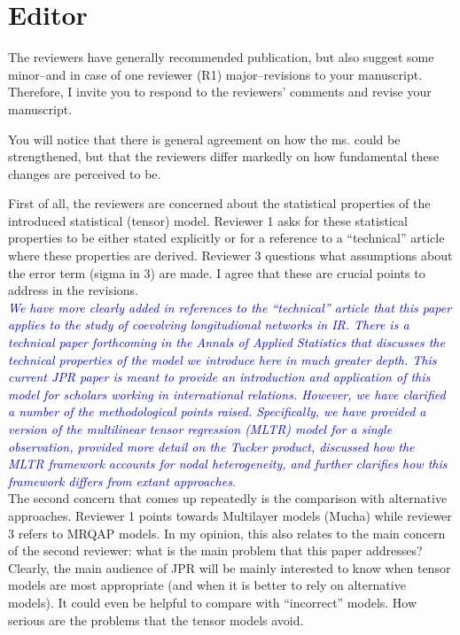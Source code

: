 \section{Editor}

The reviewers have generally recommended publication, but also suggest some minor--and in case of one reviewer (R1) major--revisions to your manuscript. Therefore, I invite you to respond to the reviewers' comments and revise your manuscript.

You will notice that there is general agreement on how the ms. could be strengthened, but that the reviewers differ markedly on how fundamental these changes are perceived to be.

First of all, the reviewers are concerned about the statistical properties of the introduced statistical (tensor) model. Reviewer 1 asks for these statistical properties to be either stated explicitly or for a reference to a ``technical'' article where these properties are derived. Reviewer 3 questions what assumptions about the error term (sigma in 3) are made. I agree that these are crucial points to address in the revisions. \\

\textcolor{blue}{\emph{
	We have more clearly added in references to the ``technical'' article that this paper applies to the study of coevolving longitudional networks in IR. There is a technical paper forthcoming in the Annals of Applied Statistics that discusses the technical properties of the model we introduce here in much greater depth. This current JPR paper is meant to provide an introduction and application of this model for scholars working in international relations. However, we have clarified a number of the methodological points raised. Specifically, we have provided a version of the multilinear tensor regression (MLTR) model for a single observation, provided more detail on the Tucker product, discussed how the MLTR framework accounts for nodal heterogeneity, and further clarifies how this framework differs from extant approaches.
}} \\

The second concern that comes up repeatedly is the comparison with alternative approaches. Reviewer 1 points towards Multilayer models (Mucha) while reviewer 3 refers to MRQAP models. In my opinion, this also relates to the main concern of the second reviewer: what is the main problem that this paper addresses? Clearly, the main audience of JPR will be mainly interested to know when tensor models are most appropriate (and when it is better to rely on alternative models). It could even be helpful to compare with ``incorrect'' models. How serious are the problems that the tensor models avoid. \\

